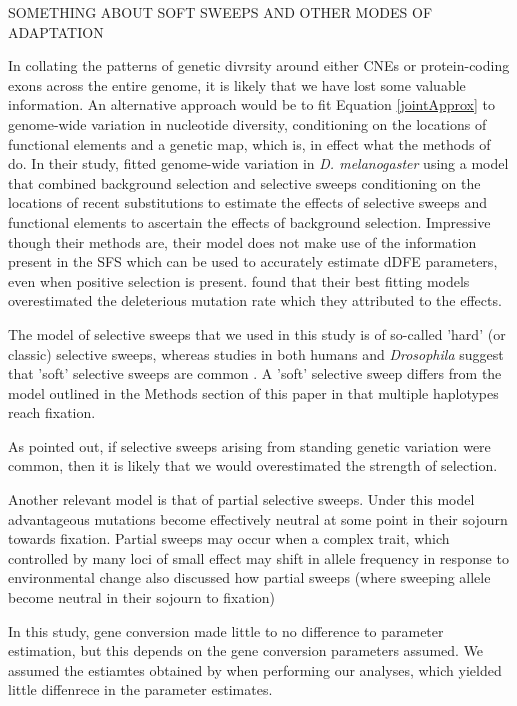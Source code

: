 SOMETHING ABOUT SOFT SWEEPS AND OTHER MODES OF ADAPTATION

In collating the patterns of genetic divrsity around either CNEs or protein-coding exons across the entire genome, it is likely that we have lost some valuable information. An alternative approach would be to fit Equation \ref{jointApprox} to genome-wide variation in nucleotide diversity, conditioning on the locations of functional elements and a genetic map, which is, in effect what the methods of \cite{RN274} do. In their study,\cite{RN274} fitted genome-wide variation in \textit{D. melanogaster} using a model that combined background selection and selective sweeps conditioning on the locations of recent substitutions to estimate the effects of selective sweeps and functional elements to ascertain the effects of background selection. Impressive though their methods are, their model does not make use of the information present in the SFS which can be used to accurately estimate dDFE parameters, even when positive selection is present. \cite{RN274} found that their best fitting models overestimated the deleterious mutation rate which they attributed to the effects.

The model of selective sweeps that we used in this study is of so-called 'hard' (or classic) selective sweeps, whereas studies in both humans and \textit{Drosophila} suggest that 'soft' selective sweeps are common \citep{RN303, RN208, RN338}. A 'soft' selective sweep differs from the model outlined in the Methods section of this paper in that multiple haplotypes reach fixation.

As \cite{RN274} pointed out, if selective sweeps arising from standing genetic variation were common, then it is likely that we would overestimated the strength of selection.

Another relevant model is that of partial selective sweeps. Under this model advantageous mutations become effectively neutral at some point in their sojourn towards fixation. 
Partial sweeps may occur when a complex trait, which  controlled by many loci of small effect may shift in allele frequency in response to environmental change 
\cite{RN274} also discussed how partial sweeps (where sweeping allele become neutral in their sojourn to fixation)


In this study, gene conversion made little to no difference to parameter estimation, but this depends on the gene conversion parameters assumed. 
We assumed the estiamtes obtained by \cite{RN263} when performing our analyses, which yielded little diffenrece in the parameter estimates.

